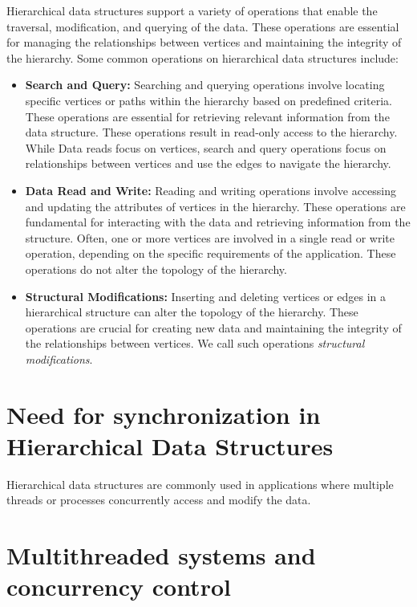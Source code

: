 Hierarchical data structures support a variety of operations that enable the traversal, modification, and querying of the data. These operations are essential for managing the relationships between vertices and maintaining the integrity of the hierarchy. Some common operations on hierarchical data structures include:

\begin{itemize}

    \item \textbf{Search and Query:} Searching and querying operations involve locating specific vertices or paths within the hierarchy based on predefined criteria. These operations are essential for retrieving relevant information from the data structure. These operations result in read-only access to the hierarchy. While Data reads focus on vertices, search and query operations focus on relationships between vertices and use the edges to navigate the hierarchy.
    
    \item \textbf{Data Read and Write:} Reading and writing operations involve accessing and updating the attributes of vertices in the hierarchy. These operations are fundamental for interacting with the data and retrieving information from the structure. Often, one or more vertices are involved in a single read or write operation, depending on the specific requirements of the application. These operations do not alter the topology of the hierarchy.

    \item \textbf{Structural Modifications:} Inserting and deleting vertices or edges in a hierarchical structure can alter the topology of the hierarchy. These operations are crucial for creating new data and maintaining the integrity of the relationships between vertices. We call such operations \emph{structural modifications}.
    

\end{itemize}


\section{Need for synchronization in Hierarchical Data Structures}

Hierarchical data structures are commonly used in applications where multiple threads or processes concurrently access and modify the data. 


\section{Multithreaded systems and concurrency control} \label{sec:multicoresystemsandconcurrencycontrol}

